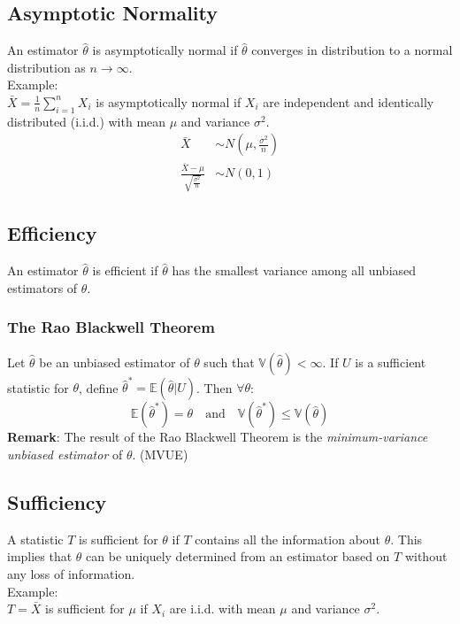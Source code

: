 \documentclass[sn-mathphys,Numbered]{sn-jnl}%
\newcommand{\Var}{\mathbb{V}}
\newcommand{\E}{\mathbb{E}}
\begin{document}
\subsection{Asymptotic Normality}\label{normality}
An estimator $\hat{\theta}$ is asymptotically normal if $\hat{\theta}$
converges in distribution to a normal distribution as $n \rightarrow \infty$.\\
Example:\\ $\bar X = \frac{1}{n} \sum_{i=1}^n X_i$ is asymptotically normal if
$X_i$ are independent and identically distributed (i.i.d.) with mean $\mu$ and
variance $\sigma^2$.
\begin{align}
    \bar{X}                                         & \sim N(\mu, \frac{\sigma^2}{n}) \\
    \frac{\bar{X} - \mu}{\sqrt{\frac{\sigma^2}{n}}} & \sim N(0, 1)
\end{align}

\subsection{Efficiency}\label{efficiency}
An estimator $\hat{\theta}$ is efficient if $\hat{\theta}$ has the smallest
variance among all unbiased estimators of $\theta$.
\subsubsection{The Rao Blackwell Theorem}\label{rao-blackwell}
Let $\hat{\theta}$ be an unbiased estimator of $\theta$ such that
$\Var(\hat{\theta}) < \infty$. If $U$ is a sufficient statistic for $\theta$,
define $\hat \theta ^ * = \E (\hat \theta | U)$. Then $\forall \theta$:
\begin{equation}
    \E(\hat \theta ^ *) = \theta \quad \text{and} \quad \Var(\hat \theta ^ *) \leq
    \Var(\hat \theta)\nonumber
\end{equation}
\textbf{Remark}: The result of the Rao Blackwell Theorem is the
\textit{minimum-variance unbiased estimator} of $\theta$. (MVUE)

\subsection{Sufficiency}\label{sufficiency}
A statistic $T$ is sufficient for $\theta$ if $T$ contains all the information
about $\theta$. This implies that $\theta$ can be uniquely determined from an
estimator based on $T$ without any loss of information.\\ Example:\\ $T = \bar
    X$ is sufficient for $\mu$ if $X_i$ are i.i.d. with mean $\mu$ and variance
$\sigma^2$.
\end{document}

